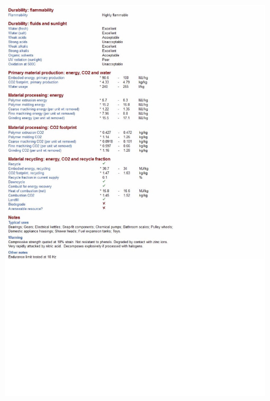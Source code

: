 \begin{figure}[H]
\centering
	\includegraphics[width=\textwidth, height=\textheight]{images/Anexos/POM2}
\end{figure}


